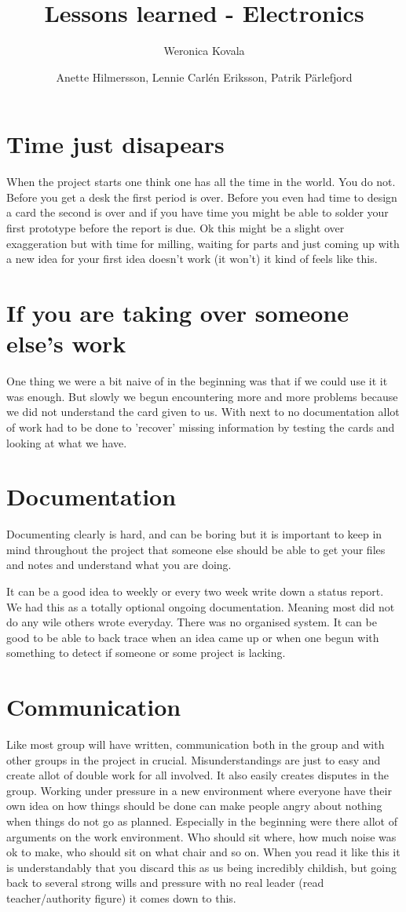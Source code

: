 \documentclass[12pt,a4paper]{article}
\author{Weronica Kovala}
\title{Lessons learned - Electronics}
\author{Anette Hilmersson, Lennie Carlén Eriksson, Patrik Pärlefjord}    					%
\begin{document}
\maketitle
\section{Time just disapears}
When the project starts one think one has all the time in the world. You do not. Before you get a desk the first period is over. Before you even had time to design a card the second is over and if you have time you might be able to solder your first prototype before the report is due. Ok this might be a slight over exaggeration but with time for milling, waiting for parts and just coming up with a new idea for your first idea doesn't work (it won't) it kind of feels like this. 

\section{If you are taking over someone else's work}
One thing we were a bit naive of in the beginning was that if we could use it it was enough. But slowly we begun encountering more and more problems because we did not understand the card given to us. With next to no documentation allot of work had to be done to 'recover' missing information by testing the cards and looking at what we have. 

\section{Documentation}
Documenting clearly is hard, and can be boring but it is important to keep in mind throughout the project that someone else should be able to get your files and notes and understand what you are doing. 

It can be a good idea to weekly or every two week write down a status report. We had this as a totally optional ongoing documentation. Meaning most did not do any wile others wrote everyday. There was no organised system. It can be good to be able to back trace when an idea came up or when one begun with something to detect if someone or some project is lacking. 

\section{Communication}
Like most group will have written, communication both in the group and with other groups in the project in crucial. Misunderstandings are just to easy and create allot of double work for all involved. It also easily creates disputes in the group. Working under pressure in a new environment where everyone have their own idea on how things should be done can make people angry about nothing when things do not go as planned. Especially in the beginning were there allot of arguments on the work environment. Who should sit where, how much noise was ok to make, who should sit on what chair and so on. When you read it like this it is understandably that you discard this as us being incredibly childish, but going back to several strong wills and pressure with no real leader (read teacher/authority figure) it comes down to this. 
\end{document}
